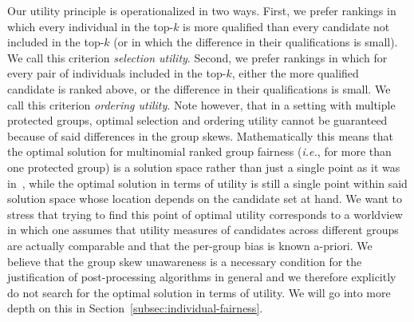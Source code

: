 Our utility principle is operationalized in two ways.
%
First, we prefer rankings in which every individual in the top-$k$ is more qualified than every candidate not included in the top-$k$ (or in which the difference in their qualifications is small). We call this criterion \emph{selection utility}.
%
Second, we prefer rankings in which for every pair of individuals included in the top-$k$, either the more qualified candidate is ranked above, or the difference in their qualifications is small. We call this criterion \emph{ordering utility}.
%
Note however, that in a setting with multiple protected groups, optimal selection and ordering utility cannot be guaranteed because of said differences in the group skews.
%
Mathematically this means that the optimal solution for multinomial ranked group fairness ({\em i.e.}, for more than one protected group) is a solution space rather than just a single point as it was in~\cite{zehlike2017fair}, while the optimal solution in terms of utility is still a single point within said solution space whose location depends on the candidate set at hand.
%
We want to stress that trying to find this point of optimal utility corresponds to a worldview in which one assumes that utility measures of candidates across different groups are actually comparable and that the per-group bias is known a-priori.
%
We believe that the group skew unawareness is a necessary condition for the justification of post-processing algorithms in general and we therefore explicitly do not search for the optimal solution in terms of utility.
%
We will go into more depth on this in Section~\ref{subsec:individual-fairness}.
%

